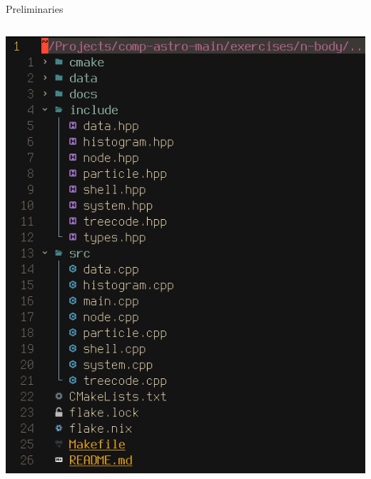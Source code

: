 \begin{frame}{Preliminaries}
\begin{columns}[T]
		\begin{column}{0.5\textwidth} %
			\includegraphics[width=\textwidth]{figures/source-tree}
		\end{column}
	\end{columns}
\end{frame}

